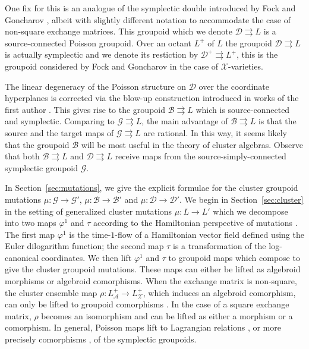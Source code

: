 \documentclass{amsart}
\numberwithin{equation}{section}
\newcommand{\cA}{\mathcal{A}}
\newcommand{\cB}{\mathcal{B}}
\newcommand{\cD}{\mathcal{D}}
\newcommand{\cG}{\mathcal{G}}
\newcommand{\cX}{\mathcal{X}}
\newcommand{\rra}{\rightrightarrows}
\begin{document}
One fix for this is an analogue of the symplectic double introduced by Fock and Goncharov \cite{FG09c}, albeit with slightly different notation to accommodate the case of non-square exchange matrices.
This groupoid which we denote $\cD \rra L$ is a source-connected Poisson groupoid.
Over an octant $L^+$ of $L$ the groupoid $\cD \rra L$ is actually symplectic and we denote its restiction by $\cD^+ \rra L^+$, this is the groupoid considered by Fock and Goncharov in the case of $\cX$-varieties.

The linear degeneracy of the Poisson structure on $\cD$ over the coordinate hyperplanes is corrected via the blow-up construction introduced in works of the first author \cite{MR3312911,MR3214314}.
This gives rise to the groupoid $\cB \rra L$ which is source-connected and symplectic.
Comparing to $\cG \rra L$, the main advantage of $\cB \rra L$ is that the source and the target maps of $\cG \rra L$ are rational.
In this way, it seems likely that the groupoid $\cB$ will be most useful in the theory of cluster algebras.
Observe that both $\cB \rra L$ and $\cD \rra L$ receive maps from the source-simply-connected symplectic groupoid $\cG$.

In Section~\ref{sec:mutations}, we give the explicit formulae for the cluster groupoid mutations $\mu: \cG \to \cG'$, $\mu: \cB \to \cB'$ and $\mu: \cD \to \cD'$.
We begin in Section~\ref{sec:cluster} in the setting of generalized cluster mutations $\mu: L \to L'$ which we decompose into two maps $\varphi^1$ and $\tau$ according to the Hamiltonian perspective of mutations \cite{FG09a, MR3691969}.
The first map $\varphi^1$ is the time-$1$-flow of a Hamiltonian vector field defined using the Euler dilogarithm function; the second map $\tau$ is a transformation of the log-canonical coordinates.
We then lift $\varphi^1$ and $\tau$ to groupoid maps which compose to give the cluster groupoid mutations.
These maps can either be lifted as algebroid morphisms or algebroid comorphisms.
When the exchange matrix is non-square, the cluster ensemble map $\rho: L^+_\cA \to L^+_\cX$, which induces an algebroid comorphism, can only be lifted to groupoid comorphisms \cite{MR3089758}.
In the case of a square exchange matrix, $\rho$ becomes an isomorphism and can be lifted as either a morphism or a comorphism.
In general, Poisson maps lift to Lagrangian relations \cite{MR2063018}, or more precisely comorphisms \cite{MR3089758}, of the symplectic groupoids.
\bigskip
\end{document}
